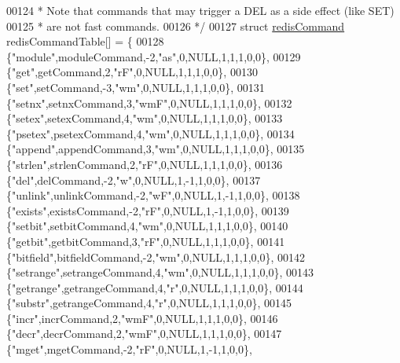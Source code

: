 \begin{DoxyCode}
00124 \textcolor{comment}{ *    Note that commands that may trigger a DEL as a side effect (like SET)}
00125 \textcolor{comment}{ *    are not fast commands.}
00126 \textcolor{comment}{ */}
00127 \textcolor{keyword}{struct} \hyperlink{structredisCommand}{redisCommand} redisCommandTable[] = \{
00128     \{\textcolor{stringliteral}{"module"},moduleCommand,-2,\textcolor{stringliteral}{"as"},0,NULL,1,1,1,0,0\},
00129     \{\textcolor{stringliteral}{"get"},getCommand,2,\textcolor{stringliteral}{"rF"},0,NULL,1,1,1,0,0\},
00130     \{\textcolor{stringliteral}{"set"},setCommand,-3,\textcolor{stringliteral}{"wm"},0,NULL,1,1,1,0,0\},
00131     \{\textcolor{stringliteral}{"setnx"},setnxCommand,3,\textcolor{stringliteral}{"wmF"},0,NULL,1,1,1,0,0\},
00132     \{\textcolor{stringliteral}{"setex"},setexCommand,4,\textcolor{stringliteral}{"wm"},0,NULL,1,1,1,0,0\},
00133     \{\textcolor{stringliteral}{"psetex"},psetexCommand,4,\textcolor{stringliteral}{"wm"},0,NULL,1,1,1,0,0\},
00134     \{\textcolor{stringliteral}{"append"},appendCommand,3,\textcolor{stringliteral}{"wm"},0,NULL,1,1,1,0,0\},
00135     \{\textcolor{stringliteral}{"strlen"},strlenCommand,2,\textcolor{stringliteral}{"rF"},0,NULL,1,1,1,0,0\},
00136     \{\textcolor{stringliteral}{"del"},delCommand,-2,\textcolor{stringliteral}{"w"},0,NULL,1,-1,1,0,0\},
00137     \{\textcolor{stringliteral}{"unlink"},unlinkCommand,-2,\textcolor{stringliteral}{"wF"},0,NULL,1,-1,1,0,0\},
00138     \{\textcolor{stringliteral}{"exists"},existsCommand,-2,\textcolor{stringliteral}{"rF"},0,NULL,1,-1,1,0,0\},
00139     \{\textcolor{stringliteral}{"setbit"},setbitCommand,4,\textcolor{stringliteral}{"wm"},0,NULL,1,1,1,0,0\},
00140     \{\textcolor{stringliteral}{"getbit"},getbitCommand,3,\textcolor{stringliteral}{"rF"},0,NULL,1,1,1,0,0\},
00141     \{\textcolor{stringliteral}{"bitfield"},bitfieldCommand,-2,\textcolor{stringliteral}{"wm"},0,NULL,1,1,1,0,0\},
00142     \{\textcolor{stringliteral}{"setrange"},setrangeCommand,4,\textcolor{stringliteral}{"wm"},0,NULL,1,1,1,0,0\},
00143     \{\textcolor{stringliteral}{"getrange"},getrangeCommand,4,\textcolor{stringliteral}{"r"},0,NULL,1,1,1,0,0\},
00144     \{\textcolor{stringliteral}{"substr"},getrangeCommand,4,\textcolor{stringliteral}{"r"},0,NULL,1,1,1,0,0\},
00145     \{\textcolor{stringliteral}{"incr"},incrCommand,2,\textcolor{stringliteral}{"wmF"},0,NULL,1,1,1,0,0\},
00146     \{\textcolor{stringliteral}{"decr"},decrCommand,2,\textcolor{stringliteral}{"wmF"},0,NULL,1,1,1,0,0\},
00147     \{\textcolor{stringliteral}{"mget"},mgetCommand,-2,\textcolor{stringliteral}{"rF"},0,NULL,1,-1,1,0,0\},

\end{DoxyCode}
